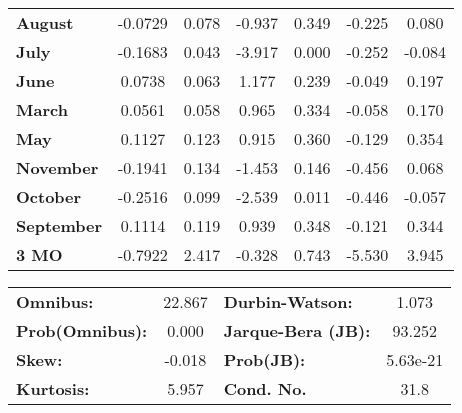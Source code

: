 \begin{center}
\begin{tabular}{lcccccc}
\textbf{August}    &      -0.0729  &        0.078     &    -0.937  &         0.349        &       -0.225    &        0.080     \\
\textbf{July}      &      -0.1683  &        0.043     &    -3.917  &         0.000        &       -0.252    &       -0.084     \\
\textbf{June}      &       0.0738  &        0.063     &     1.177  &         0.239        &       -0.049    &        0.197     \\
\textbf{March}     &       0.0561  &        0.058     &     0.965  &         0.334        &       -0.058    &        0.170     \\
\textbf{May}       &       0.1127  &        0.123     &     0.915  &         0.360        &       -0.129    &        0.354     \\
\textbf{November}  &      -0.1941  &        0.134     &    -1.453  &         0.146        &       -0.456    &        0.068     \\
\textbf{October}   &      -0.2516  &        0.099     &    -2.539  &         0.011        &       -0.446    &       -0.057     \\
\textbf{September} &       0.1114  &        0.119     &     0.939  &         0.348        &       -0.121    &        0.344     \\
\textbf{3 MO}      &      -0.7922  &        2.417     &    -0.328  &         0.743        &       -5.530    &        3.945     \\
\bottomrule
\end{tabular}
\begin{tabular}{lclc}
\textbf{Omnibus:}       & 22.867 & \textbf{  Durbin-Watson:     } &    1.073  \\
\textbf{Prob(Omnibus):} &  0.000 & \textbf{  Jarque-Bera (JB):  } &   93.252  \\
\textbf{Skew:}          & -0.018 & \textbf{  Prob(JB):          } & 5.63e-21  \\
\textbf{Kurtosis:}      &  5.957 & \textbf{  Cond. No.          } &     31.8  \\
\bottomrule
\end{tabular}
\end{center}

